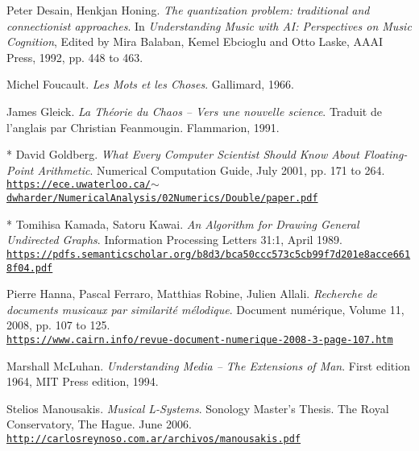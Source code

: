 \begin{thebibliography}{99}
	Peter Desain, Henkjan Honing. \textit{The quantization problem: traditional and connectionist approaches}. In \textit{Understanding Music with AI: Perspectives on Music Cognition}, Edited by Mira Balaban, Kemel Ebcioglu and Otto Laske, AAAI Press, 1992, pp. 448 to 463.
	
	Michel Foucault. \textit{Les Mots et les Choses}. Gallimard, 1966.

	James Gleick. \textit{La Th\'eorie du Chaos -- Vers une nouvelle science}. Traduit de l'anglais par Christian Feanmougin. Flammarion, 1991.
	
	 * David Goldberg. \textit{What Every Computer Scientist Should Know About Floating-Point Arithmetic}. Numerical Computation Guide, July 2001, pp. 171 to 264.\\ \href{https://ece.uwaterloo.ca/\~dwharder/NumericalAnalysis/02Numerics/Double/paper.pdf}{\scriptsize{\texttt{https://ece.uwaterloo.ca/$\sim$dwharder/NumericalAnalysis/02Numerics/Double/paper.pdf}}} \normalsize{}
	 
	 * Tomihisa Kamada, Satoru Kawai. \textit{An Algorithm for Drawing General Undirected Graphs}. Information Processing Letters 31:1, April 1989.\\ \href{https://pdfs.semanticscholar.org/b8d3/bca50ccc573c5cb99f7d201e8acce6618f04.pdf}{\scriptsize{\texttt{https://pdfs.semanticscholar.org/b8d3/bca50ccc573c5cb99f7d201e8acce6618f04.pdf}}} \normalsize{}
	 
	Pierre Hanna, Pascal Ferraro, Matthias Robine, Julien Allali. \textit{Recherche de documents musicaux par similarit\'{e} m\'{e}lodique}. Document num\'{e}rique, Volume 11, 2008, pp. 107 to 125.\\ 
	\href{https://www.cairn.info/revue-document-numerique-2008-3-page-107.htm}{\scriptsize{\texttt{https://www.cairn.info/revue-document-numerique-2008-3-page-107.htm}}} \normalsize{}
	 	 
	Marshall McLuhan. \textit{Understanding Media -- The Extensions of  Man}. First edition 1964, MIT Press edition, 1994.
		 
	Stelios Manousakis. \textit{Musical L-Systems}. Sonology Master's Thesis. The Royal Conservatory, The Hague. June 2006.\\ \href{http://carlosreynoso.com.ar/archivos/manousakis.pdf}{\scriptsize{\texttt{http://carlosreynoso.com.ar/archivos/manousakis.pdf}}} \normalsize{}
	

\end{thebibliography}
